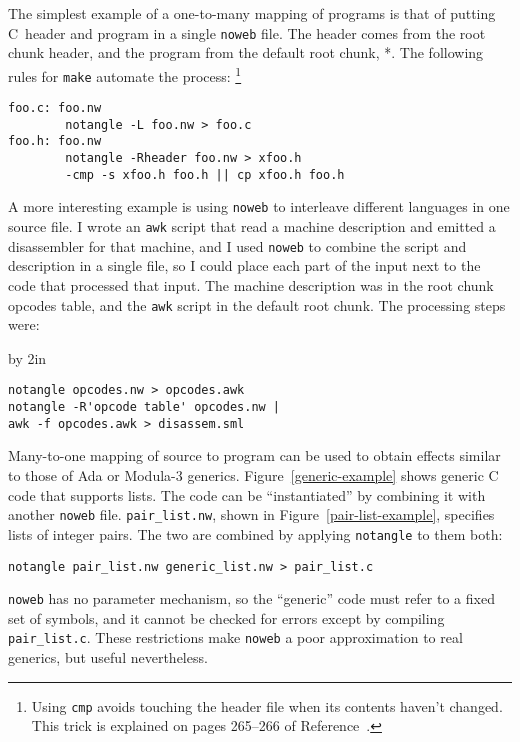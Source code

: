 The simplest example of a one-to-many mapping of programs is that of putting
C~header and program in a single {\tt noweb} file.
The header comes from the root chunk \LA{}header\RA{}, and the program
from the default root chunk, \LA{}*\RA{}.
The following rules for {\tt make} automate the process:%
\footnote{Using \verb+cmp+ avoids touching the header file when its contents
haven't changed.
This trick is explained on pages 265--266 of Reference~.}
\begin{verbatim}
foo.c: foo.nw
        notangle -L foo.nw > foo.c
foo.h: foo.nw
        notangle -Rheader foo.nw > xfoo.h
        -cmp -s xfoo.h foo.h || cp xfoo.h foo.h
\end{verbatim}
A more interesting example is using {\tt noweb} to
interleave different languages in one source file. 
I wrote an \verb+awk+
script that read a machine description and emitted a disassembler for
that machine, and I used {\tt noweb} to combine the script and description
in a single file, so I could place each part of the input next to the
code that processed that input. 
The machine description was in the root chunk \LA{}opcodes
table\RA{}, and the \verb+awk+ script in the default root chunk.
The processing steps were:
{\par\advance\hsize by 2in %
\begin{verbatim}
notangle opcodes.nw > opcodes.awk
notangle -R'opcode table' opcodes.nw | 
awk -f opcodes.awk > disassem.sml
\end{verbatim}
}

Many-to-one mapping of source to program can be used to obtain
effects similar to those of Ada or Modula-3 generics.
Figure~\ref{generic-example} shows generic C code that supports lists.
The code can be
``instantiated'' by combining it with another \verb+noweb+ file.
\verb+pair_list.nw+, shown in Figure~\ref{pair-list-example}, specifies
 lists of integer pairs.
The two are combined by applying \verb+notangle+ to them both:
\begin{verbatim}
notangle pair_list.nw generic_list.nw > pair_list.c
\end{verbatim} 
{\tt noweb} has no parameter mechanism, so the ``generic'' code must
refer to a fixed set of symbols, and it cannot be checked for errors
except by compiling \verb+pair_list.c+.
These restrictions make {\tt noweb} a poor approximation to real
generics, but useful nevertheless.

